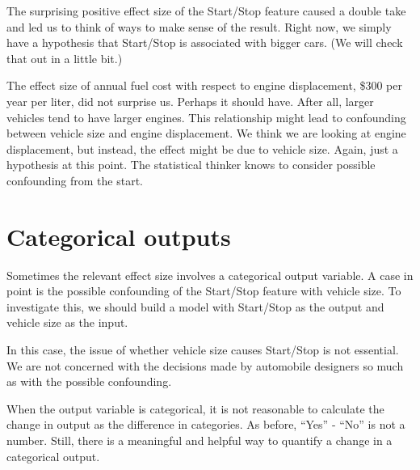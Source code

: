 \documentclass[
  letterpaper,
  DIV=11,
  numbers=noendperiod,
  oneside]{scrreprt}
\begin{document}
\begin{tcolorbox}[enhanced jigsaw, colbacktitle=quarto-callout-warning-color!10!white, breakable, opacitybacktitle=0.6, colback=white, left=2mm, arc=.35mm, colframe=quarto-callout-warning-color-frame, coltitle=black, toprule=.15mm, opacityback=0, leftrule=.75mm, bottomtitle=1mm, toptitle=1mm, titlerule=0mm, title=\textcolor{quarto-callout-warning-color}{\faExclamationTriangle}\hspace{0.5em}{Confounding?}, rightrule=.15mm, bottomrule=.15mm]

The surprising positive effect size of the Start/Stop feature caused a
double take and led us to think of ways to make sense of the result.
Right now, we simply have a hypothesis that Start/Stop is associated
with bigger cars. (We will check that out in a little bit.)

The effect size of annual fuel cost with respect to engine displacement,
\$300 per year per liter, did not surprise us. Perhaps it should have.
After all, larger vehicles tend to have larger engines. This
relationship might lead to confounding between vehicle size and engine
displacement. We think we are looking at engine displacement, but
instead, the effect might be due to vehicle size. Again, just a
hypothesis at this point. The statistical thinker knows to consider
possible confounding from the start.

\end{tcolorbox}

\hypertarget{categorical-outputs}{%
\section{Categorical outputs}\label{categorical-outputs}}

Sometimes the relevant effect size involves a categorical output
variable. A case in point is the possible confounding of the Start/Stop
feature with vehicle size. To investigate this, we should build a model
with Start/Stop as the output and vehicle size as the input.

In this case, the issue of whether vehicle size causes Start/Stop is not
essential. We are not concerned with the decisions made by automobile
designers so much as with the possible confounding.

When the output variable is categorical, it is not reasonable to
calculate the change in output as the difference in categories. As
before, ``Yes'' - ``No'' is not a number. Still, there is a meaningful
and helpful way to quantify a change in a categorical output.
\end{document}
